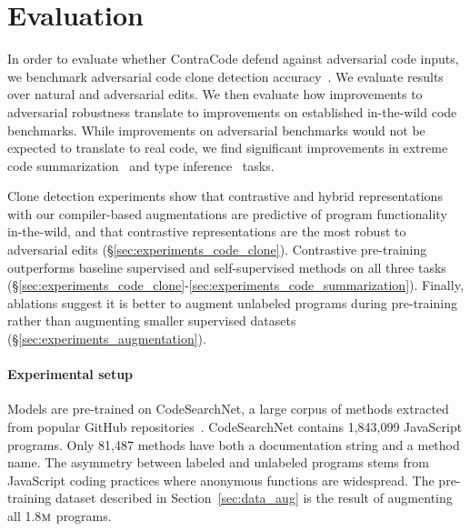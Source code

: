 \documentclass[11pt]{article}
\newcommand{\million}[0]{$\textsc{m}$}
\newcommand{\ours}[0]{ContraCode}
\begin{document}
\section{Evaluation}
\label{sec:experiments}
In order to evaluate whether \ours{} defend against adversarial code inputs, we benchmark adversarial code clone detection accuracy~\citep{Baker92aprogram}. We evaluate results over natural and adversarial edits. We then evaluate how improvements to adversarial robustness translate to improvements on established in-the-wild code benchmarks. While improvements on adversarial benchmarks would not be expected to translate to real code, we find significant improvements in extreme code summarization~\citep{allamanis2016convolutional} and type inference~\citep{hellendoorn2018deep} tasks.

Clone detection experiments show that contrastive and hybrid representations with our compiler-based augmentations are predictive of program functionality in-the-wild, and that contrastive representations are the most robust to adversarial edits (\S\ref{sec:experiments_code_clone}).
Contrastive pre-training outperforms baseline supervised and self-supervised methods on all three tasks (\S\ref{sec:experiments_code_clone}-\ref{sec:experiments_code_summarization}). Finally, ablations suggest it is better to augment unlabeled programs during pre-training rather than augmenting smaller supervised datasets (\S\ref{sec:experiments_augmentation}).

\paragraph{Experimental setup}
Models are pre-trained on CodeSearchNet, a large corpus of methods extracted from popular GitHub repositories~\citep{husain2019codesearchnet}. CodeSearchNet contains 1,843,099 JavaScript programs. Only 81,487 methods have both a documentation string and a method name. The asymmetry between labeled and unlabeled programs stems from JavaScript coding practices where anonymous functions are widespread. The pre-training dataset described in Section~\ref{sec:data_aug} is the result of augmenting all 1.8\million{} programs.
\end{document}

